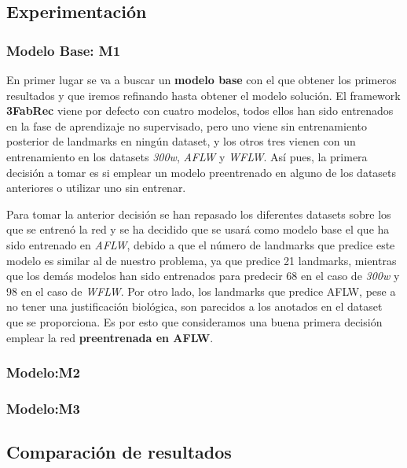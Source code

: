     \subsection{Experimentación}
        \subsubsection{Modelo Base: M1}
            \noindent En primer lugar se va a buscar un \textbf{modelo base} con el que obtener los primeros resultados y que iremos refinando hasta obtener el modelo solución. El framework \textbf{3FabRec} viene por defecto con cuatro modelos, todos ellos han sido entrenados en la fase de aprendizaje no supervisado, pero uno viene sin entrenamiento posterior de landmarks en ningún dataset, y los otros tres vienen con un entrenamiento en los datasets \textit{300w}, \textit{AFLW} y \textit{WFLW}. Así pues, la primera decisión a tomar es si emplear un modelo preentrenado en alguno de los datasets anteriores o utilizar uno sin entrenar. 

            \medskip

            \noindent Para tomar la anterior decisión se han repasado los diferentes datasets sobre los que se entrenó la red y se ha decidido que se usará como modelo base el que ha sido entrenado en \textit{AFLW}, debido a que el número de landmarks que predice este modelo es similar al de nuestro problema, ya que predice 21 landmarks, mientras que los demás modelos han sido entrenados para predecir 68 en el caso de \textit{300w} y 98 en el caso de \textit{WFLW}. Por otro lado, los landmarks que predice AFLW, pese a no tener una justificación biológica, son parecidos a los anotados en el dataset que se proporciona. Es por esto que consideramos una buena primera decisión emplear la red \textbf{preentrenada en AFLW}.

        \subsubsection{Modelo:M2}
        \subsubsection{Modelo:M3}
    \subsection{Comparación de resultados}
\endinput



